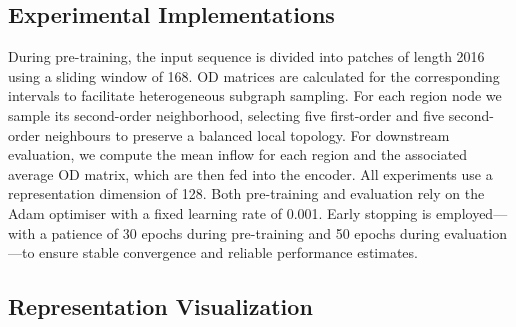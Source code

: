 \subsection{Experimental Implementations}
During pre-training, the input sequence is divided into patches of length 2016 using a sliding window of 168. OD matrices are calculated for the corresponding intervals to facilitate heterogeneous subgraph sampling. For each region node we sample its second-order neighborhood, selecting five first-order and five second-order neighbours to preserve a balanced local topology. For downstream evaluation, we compute the mean inflow for each region and the associated average OD matrix, which are then fed into the encoder. All experiments use a representation dimension of 128. Both pre-training and evaluation rely on the Adam optimiser with a fixed learning rate of 0.001. Early stopping is employed—with a patience of 30 epochs during pre-training and 50 epochs during evaluation—to ensure stable convergence and reliable performance estimates.

\subsection{Representation Visualization}


